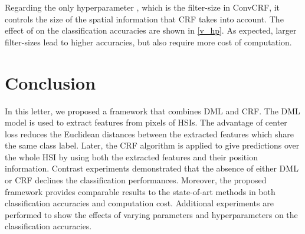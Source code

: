 \documentclass[]{article}
\newcommand{\red}{\color{black}}
\newcommand{\magentaso}{\color{black}}
\begin{document}
Regarding the only hyperparameter , {\magentaso which is the filter-size} in ConvCRF, it controls the size of the spatial information that CRF takes into account.
The effect of  on the classification accuracies are shown in \cref{v_hp}.
As expected, larger filter-sizes lead to higher accuracies, but also require more cost of computation.

\section{Conclusion}\label{sec: Conclusion}
In this letter, we proposed a framework that combines DML and CRF. 
The DML model is used to extract features from pixels of HSIs. The advantage of center loss
reduces the Euclidean distances between the extracted features which share the same class label.
Later, the CRF algorithm is applied to give predictions over the whole HSI by using both the extracted features
and {\red their} position information.
Contrast experiments demonstrated that the absence of either DML or CRF declines the classification performances.
Moreover, the proposed framework {\red provides comparable results to the state-of-art methods in both 
classification accuracies and computation cost.}
Additional experiments are performed to show the effects of varying parameters and hyperparameters 
on the classification accuracies.






\end{document}
